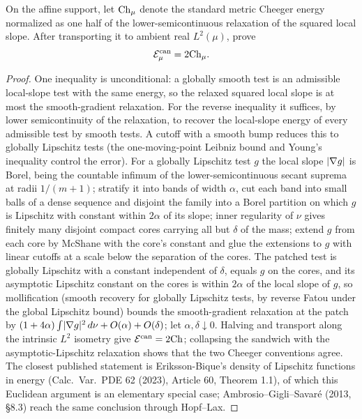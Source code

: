 \begin{theorem}
  \label{thm:smooth-gradient-relaxation-two-cheeger}
  \leanok
  On the affine support, let $\mathrm{Ch}_\mu$ denote the standard metric Cheeger energy normalized as
  one half of the lower-semicontinuous relaxation of the squared local slope.  After transporting
  it to ambient real $L^2(\mu)$, prove
  \[
    \mathcal E^{\mathrm{can}}_\mu=2\mathrm{Ch}_\mu.
  \]
\end{theorem}
\begin{proof}
  \leanok
  One inequality is unconditional: a globally smooth test is an admissible local-slope test with
  the same energy, so the relaxed squared local slope is at most the smooth-gradient relaxation.
  For the reverse inequality it suffices, by lower semicontinuity of the relaxation, to recover the
  local-slope energy of every admissible test by smooth tests.  A cutoff with a smooth bump reduces
  this to globally Lipschitz tests (the one-moving-point Leibniz bound and Young's inequality
  control the error).  For a globally Lipschitz test $g$ the local slope $\lvert\nabla g\rvert$ is Borel,
  being the countable infimum of the lower-semicontinuous secant suprema at radii $1/(m+1)$;
  stratify it into bands of width $\alpha$, cut each band into small balls of a dense sequence and
  disjoint the family into a Borel partition on which $g$ is Lipschitz with constant within
  $2\alpha$ of its slope; inner regularity of $\nu$ gives finitely many disjoint compact cores
  carrying all but $\delta$ of the mass; extend $g$ from each core by McShane with the core's
  constant and glue the extensions to $g$ with linear cutoffs at a scale below the separation of
  the cores.  The patched test is globally Lipschitz with a constant independent of $\delta$,
  equals $g$ on the cores, and its asymptotic Lipschitz constant on the cores is within $2\alpha$
  of the local slope of $g$, so mollification (smooth recovery for globally Lipschitz tests, by
  reverse Fatou under the global Lipschitz bound) bounds the smooth-gradient relaxation at the
  patch by $(1+4\alpha)\int\lvert\nabla g\rvert^2\,d\nu+O(\alpha)+O(\delta)$; let
  $\alpha,\delta\downarrow0$.  Halving and transport along the intrinsic $L^2$ isometry give
  $\mathcal E^{\mathrm{can}}=2\mathrm{Ch}$; collapsing the sandwich with the asymptotic-Lipschitz
  relaxation shows that the two Cheeger conventions agree.  The closest published statement is
  Eriksson-Bique's density of Lipschitz functions in energy (Calc.\ Var.\ PDE 62 (2023),
  Article 60, Theorem 1.1), of which this Euclidean argument is an elementary special case;
  Ambrosio--Gigli--Savar\'e (2013, \S8.3) reach the same conclusion through Hopf--Lax.
\end{proof}

